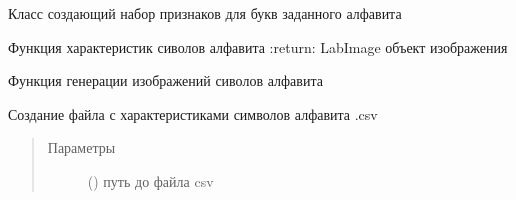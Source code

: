 \documentclass[letterpaper,10pt,russian]{sphinxmanual}
\begin{document}
\begin{fulllineitems}
\label{\detokenize{FontCharacteristics:SymbolImage.FontCharacteristics}}
Класс создающий набор признаков для букв заданного алфавита

\begin{fulllineitems}
\label{\detokenize{FontCharacteristics:SymbolImage.FontCharacteristics.calc_characteristics}}
Функция характеристик сиволов алфавита
:return: LabImage \textendash{} объект изображения

\end{fulllineitems}


\begin{fulllineitems}
\label{\detokenize{FontCharacteristics:SymbolImage.FontCharacteristics.create_symbol_images}}
Функция генерации изображений сиволов алфавита

\end{fulllineitems}


\begin{fulllineitems}
\label{\detokenize{FontCharacteristics:SymbolImage.FontCharacteristics.to_csv}}
Создание файла с характеристиками символов алфавита .csv
\begin{quote}\begin{description}
\item[{Параметры}] \leavevmode
{} () \textendash{} путь до файла csv

\end{description}\end{quote}

\end{fulllineitems}


\end{fulllineitems}
\end{document}
